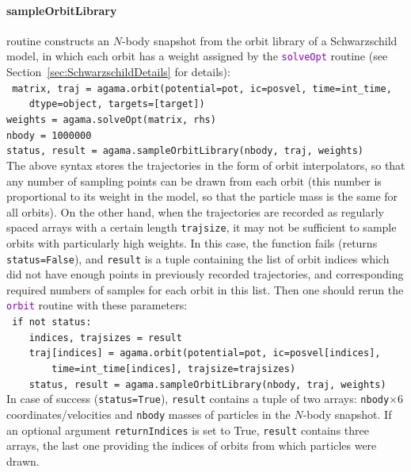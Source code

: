 \documentclass[12pt]{article}
\newcommand{\ttt}[1]{\textcolor{darkviolet}{\texttt{#1}}}
\begin{document}
\paragraph{sampleOrbitLibrary} routine constructs an $N$-body snapshot from the orbit library of a Schwarzschild model, in which each orbit has a weight assigned by the \ttt{solveOpt} routine (see Section~\ref{sec:SchwarzschildDetails} for details):\\[1mm]
\texttt{
matrix, traj = agama.orbit(potential=pot, ic=posvel, time=int_time, \\
\mbox{}~~~~dtype=object, targets=[target])\\
weights = agama.solveOpt(matrix, rhs)\\
nbody = 1000000\\
status, result = agama.sampleOrbitLibrary(nbody, traj, weights)}\\[2mm]
The above syntax stores the trajectories in the form of orbit interpolators, so that any number of sampling points can be drawn from each orbit (this number is proportional to its weight in the model, so that the particle mass is the same for all orbits). On the other hand, when the trajectories are recorded as regularly spaced arrays with a certain length \texttt{trajsize}, it may not be sufficient to sample orbits with particularly high weights. In this case, the function fails (returns \texttt{status=False}), and \texttt{result} is a tuple containing the list of orbit indices which did not have enough points in previously recorded trajectories, and corresponding required numbers of samples for each orbit in this list. Then one should rerun the \ttt{orbit} routine with these parameters:\\[1mm]
\texttt{
if not status:\\
\mbox{}~~~~indices, trajsizes = result\\
\mbox{}~~~~traj[indices] = agama.orbit(potential=pot, ic=posvel[indices], \\
\mbox{}~~~~~~~~time=int_time[indices], trajsize=trajsizes)\\
\mbox{}~~~~status, result = agama.sampleOrbitLibrary(nbody, traj, weights)}\\[2mm]
In case of success (\texttt{status=True}), \texttt{result} contains a tuple of two arrays: \texttt{nbody}$\times6$ coordinates/velocities and \texttt{nbody} masses of particles in the $N$-body snapshot. If an optional argument \texttt{returnIndices} is set to True, \texttt{result} contains three arrays, the last one providing the indices of orbits from which particles were drawn.
\end{document}

